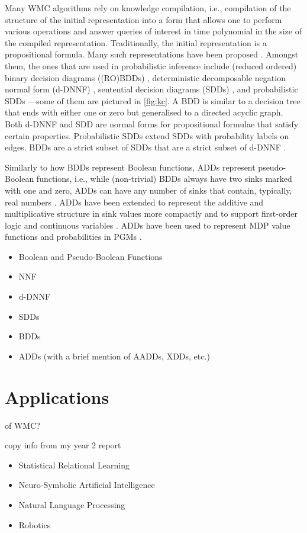 Many WMC algorithms rely on knowledge compilation, i.e., compilation of the
structure of the initial representation into a form that allows one to perform
various operations and answer queries of interest in time polynomial in the size
of the compiled representation. Traditionally, the initial representation is a
propositional formula. Many such representations have been proposed
\citep{DBLP:journals/jair/DarwicheM02}. Amongst them, the ones that are used in
probabilistic inference include (reduced ordered) binary decision diagrams
((RO)BDDs) \citep{DBLP:journals/tc/Bryant86}, deterministic decomposable negation
normal form (d-DNNF) \citep{DBLP:journals/jancl/Darwiche01}, sentential decision
diagrams (SDDs) \citep{DBLP:conf/ijcai/Darwiche11}, and probabilistic SDDs
\citep{DBLP:conf/kr/KisaBCD14}---some of them are pictured in \cref{fig:kc}. A
BDD is similar to a decision tree that ends with either one or zero but
generalised to a directed acyclic graph. Both d-DNNF and SDD are normal forms
for propositional formulae that satisfy certain properties. Probabilistic SDDs
extend SDDs with probability labels on edges. BDDs are a strict subset of SDDs
that are a strict subset of d-DNNF \citep{DBLP:conf/ijcai/Darwiche11}.

Similarly to how BDDs represent Boolean functions, ADDs represent pseudo-Boolean
functions, i.e., while (non-trivial) BDDs always have two sinks marked with one
and zero, ADDs can have any number of sinks that contain, typically, real
numbers \citep{DBLP:journals/fmsd/BaharFGHMPS97}. ADDs have been extended to
represent the additive and multiplicative structure in sink values more
compactly \citep{DBLP:conf/ijcai/SannerM05} and to support first-order logic
\citep{DBLP:journals/ai/SannerB09} and continuous variables
\citep{DBLP:conf/uai/SannerDB11}. ADDs have been used to represent MDP value
functions \citep{DBLP:conf/uai/HoeySHB99} and probabilities in PGMs
\citep{DBLP:conf/ijcai/ChaviraD07,DBLP:conf/uai/GogateD11}.

\begin{itemize}
\item Boolean and Pseudo-Boolean Functions
\item NNF
\item d-DNNF
\item SDDs
\item BDDs
\item ADDs (with a brief mention of AADDs, XDDs, etc.)
\end{itemize}

\section{Applications}

of WMC?

copy info from my year 2 report

\begin{itemize}
\item Statistical Relational Learning
\item Neuro-Symbolic Artificial Intelligence
\item Natural Language Processing
\item Robotics
\end{itemize}
